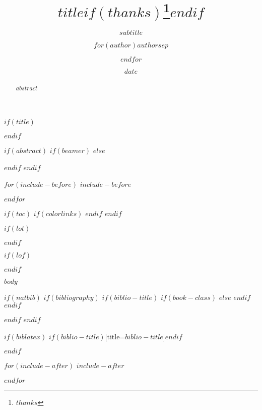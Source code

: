 \documentclass[$if(fontsize)$$fontsize$$else$11pt$endif$]{$documentclass$}
\title{$title$$if(thanks)$\thanks{$thanks$}$endif$}
\subtitle{$subtitle$}
\author{$for(author)$$author$$sep$ \and $endfor$}
\institute{$for(institute)$$institute$$sep$ \and $endfor$}
\date{$date$}
\date{}
\begin{document}
$if(title)$
\maketitle
$endif$

$if(abstract)$
$if(beamer)$
$else$
\begin{abstract}
$abstract$
\end{abstract}
$endif$
$endif$

$for(include-before)$
$include-before$

$endfor$

$if(toc)$
{
$if(colorlinks)$
\hypersetup{linkcolor=$if(toccolor)$$toccolor$$else$black$endif$}
$endif$
\setcounter{tocdepth}{$toc-depth$}
\tableofcontents
}
$endif$

$if(lot)$
\listoftables
$endif$

$if(lof)$
\listoffigures
$endif$

$body$

$if(natbib)$
$if(bibliography)$
$if(biblio-title)$
$if(book-class)$
\renewcommand{\bibname}{$biblio-title$}
$else$
\renewcommand{\refname}{$biblio-title$}
$endif$
$endif$


$endif$
$endif$

$if(biblatex)$
\printbibliography$if(biblio-title)$[title=$biblio-title$]$endif$

$endif$

$for(include-after)$
$include-after$

$endfor$
\end{document}
